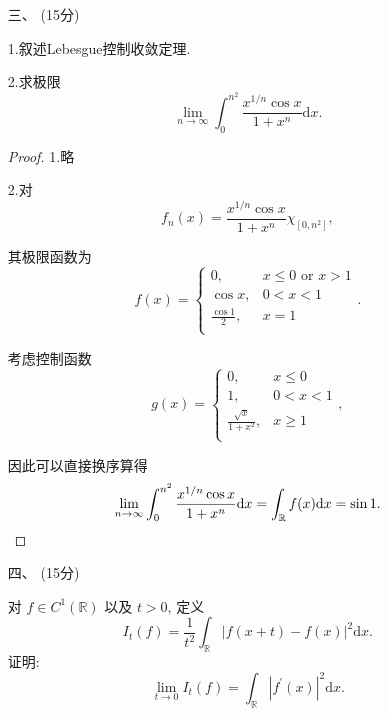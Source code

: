 \begin{itemize}
2.对$ k=0,1,\cdots,9 $,求$ f^{-1}(k) $的测度.

\begin{proof}
1.考虑$ f_{n}(x)=x_{n} $,则$ f(x)=\sup f_{n}(x) $.
只需证明$ f_{n} $是Borel可测的,就有$ f $也是Borel可测的.

注意到$ f_{n}(x)=[10^{n}x]-10[10^{n-1}x] $是简单函数,自然可测,证完.

2.对任意$ x\in f^{-1}(9) $, $ x $的十进制展开含有$ 9 $,
即$ f^{-1}(9)=\bigcup_{n=1}^{\infty}A_{n} $,
其中$ A_{n} $即第$ n $位是$ 9 $,而前$ n-1 $位不是$ 9 $的数构成的集合.
易见这是个无交并,又$ m(A_{n})=9^{n-1}10^{-n} $,可得$ m(f^{-1}(9))=1 $.
从而$ k\le 8 $时其测度为$ 0 $.
\end{proof}

\item[三、](15分)

1.叙述Lebesgue控制收敛定理.

2.求极限
$$
\lim_{n\rightarrow \infty}\int_0^{n^2}{\frac{x^{1/n}\cos x}{1+x^n}\text{d}x}.
$$

\begin{proof}
1.略

2.对$$
f_n( x ) =\frac{x^{1/n}\cos x}{1+x^n}\chi _{\left[ 0,n^2 \right]},
$$

其极限函数为
$$
f( x ) =\left\{ \begin{array}{ll}
	0, & x\le 0 \text{ or } x>1\\
	\cos x,&0<x<1\\
	\frac{\cos 1}{2}, & x=1\\
\end{array} \right. .
$$

考虑控制函数
$$
g( x ) =\left\{ \begin{array}{ll}
	0,&x\le 0\\
	1,&0<x<1\\
	\frac{\sqrt{x}}{1+x^2},&x\ge 1\\
\end{array} \right. ,
$$

因此可以直接换序算得
$$
\lim_{n\rightarrow \infty}\int_0^{n^2}{\frac{x^{1/n}\cos x}{1+x^n}\text{d}x}
=\int_{\mathbb{R} }f(x)\mathrm{d} x=\sin1.\qedhere
$$
\end{proof}

\item[四、](15分)

对 $f \in C^1(\mathbb{R})$ 以及 $t>0$, 定义
$$I_t(f)=\frac{1}{t^2} \int_{\mathbb{R}}|f(x+t)-f(x)|^2 \text{d} x.$$
证明:
$$\lim_{t \rightarrow 0} I_t(f)=\int_{\mathbb{R}}|f^{\prime}(x)|^2 \text{d} x.$$


\end{itemize}
